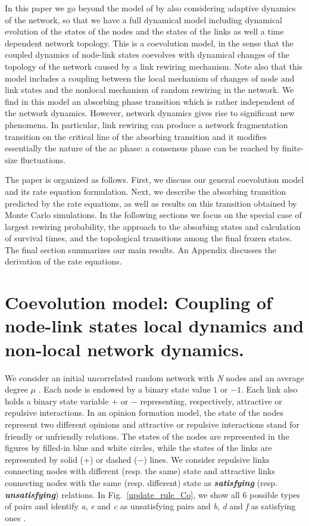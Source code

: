 \documentclass[aps,pre,notitlepage]{revtex4-1}
\begin{document}
In this paper we go beyond the model of \cite{saeedian2019absorbing} by also considering adaptive dynamics of the network, so that we have a full dynamical model including dynamical evolution of the states of the nodes and the states of the links as well a time dependent network topology. This is a coevolution model, in the sense that the coupled dynamics of node-link states coevolves with dynamical changes of the topology of the network caused by a link rewiring mechanism. Note also that this model includes a coupling between the local mechanism of changes of node and link states and the nonlocal mechanism of random rewiring in the network.
We find in this model an absorbing phase transition which is rather independent of the network dynamics. However, network dynamics gives rise to significant new phenomena. In particular, link rewiring can produce a network fragmentation transition on the critical line of the absorbing transition and it modifies essentially the nature of the ac phase: a consensus phase can be reached by finite-size fluctuations.


The paper is organized as follows. First, we discuss our general coevolution model and its rate equation formulation. Next, we describe the absorbing transition predicted by the rate equations, as well as results on this transition obtained by Monte Carlo simulations. In the following sections we focus on the special case of largest rewiring probability, the approach to the absorbing states and calculation of survival times, and the topological transitions among the final frozen states. The final section summarizes our main results. An Appendix discusses the derivation of the rate equations.

\section*{Coevolution model: Coupling of node-link states local dynamics and non-local network dynamics.}
We consider an initial uncorrelated random network with \textit{N} nodes and an average degree $\mu$ \cite{albert2002statistical}. Each node is endowed by a binary state value $1$ or $-1$. Each link also holds a binary state variable $+$ or $-$ representing, respectively, attractive or repulsive interactions. In an opinion formation model, the state of the nodes represent two different opinions and attractive or repulsive interactions stand for friendly or unfriendly relations. The states of the nodes are represented in the figures by filled-in blue and white circles, while the states of the links are represented by solid ($+$) or dashed ($-$) lines. We consider repulsive links connecting nodes with different (resp. the same) state and attractive links connecting nodes with the same (resp. different) state as \textbf{\textit{satisfying}} (resp. \textbf{\textit{unsatisfying}}) relations. In Fig.~\ref{update_rule_Co}, we show all $6$ possible types of pairs and identify \textit{a}, \textit{e} and \textit{c} as unsatisfying pairs and \textit{b}, \textit{d} and \textit{f} as satisfying ones \cite{saeedian2019absorbing}.
\end{document}
